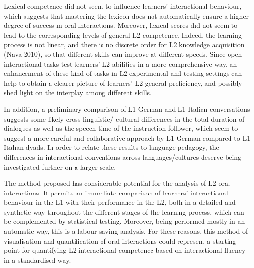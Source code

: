 \begin{styleStandard}
Lexical competence did not seem to influence learners’ interactional behaviour, which suggests that mastering the lexicon does not automatically ensure a higher degree of success in oral interactions. Moreover, lexical scores did not seem to lead to the corresponding levels of general L2 competence. Indeed, the learning process is not linear, and there is no discrete order for L2 knowledge acquisition (Nava 2010), so that different skills can improve at different speeds. Since open interactional tasks test learners’ L2 abilities in a more comprehensive way, an enhancement of these kind of tasks in L2 experimental and testing settings can help to obtain a clearer picture of learners’ L2 general proficiency, and possibly shed light on the interplay among different skills.
\end{styleStandard}

\begin{styleStandard}
In addition, a preliminary comparison of L1 German and L1 Italian conversations suggests some likely cross-linguistic/-cultural differences in the total duration of dialogues as well as the speech time of the instruction follower, which seem to suggest a more careful and collaborative approach by L1 German compared to L1 Italian dyads. In order to relate these results to language pedagogy, the differences in interactional conventions across languages/cultures deserve being investigated further on a larger scale.
\end{styleStandard}

\begin{styleStandard}
The method proposed has considerable potential for the analysis of L2 oral interactions. It permits an immediate comparison of learners’ interactional behaviour in the L1 with their performance in the L2, both in a detailed and synthetic way throughout the different stages of the learning process, which can be complemented by statistical testing. Moreover, being performed mostly in an automatic way, this is a labour-saving analysis. For these reasons, this method of visualisation and quantification of oral interactions could represent a starting point for quantifying L2 interactional competence based on interactional fluency in a standardised way.
\end{styleStandard}

